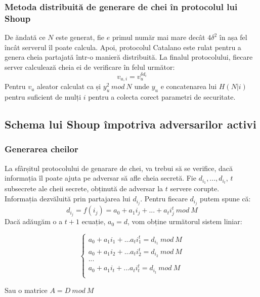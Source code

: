 \documentclass[12]{report}
\begin{document}
\subsubsection{Metoda distribuită de generare de chei în protocolul lui Shoup}
De ăndată ce $N$ este generat, fie $e$ primul număr mai mare decât $4 \delta^{2}$  în așa fel încât serverul îl poate calcula. Apoi, protocolul Catalano \cite{catalano} este rulat pentru a genera cheia partajată într-o manieră distribuită. La finalul protocolului, fiecare server calculează cheia ei de verificare în felul următor:
$$ v_{u,i} = v_{u}^{\delta d_i}$$
Pentru $v_u$ aleator calculat ca și $y_{u}^{2} \ mod \ N$ unde $y_u$ e concatenarea lui $H(N|i)$ pentru suficient de mulți $i$ pentru a colecta corect parametri de securitate.

\subsection{Schema lui Shoup împotriva adversarilor activi}
\subsubsection{Generarea cheilor}
La sfârșitul protocolului de genarare de chei, va trebui să se verifice, dacă informația îl poate ajuta pe adversar să afle cheia secretă. Fie $d_{i_1},...,d_{i_t}$, $t$ subsecrete ale cheii secrete, obținută de adversar la $t$ servere corupte. \\
Informația dezvăluită prin partajarea lui $d_{i_j}$. Pentru fiecare $d_{i_j}$ putem spune că: 
$$d_{i_j} = f(i_j) = a_0 + a_1i_j + ... + a_t i_{j}^{t} \ mod \ M       $$
Dacă adăugăm o a $t+1$ ecuație, $a_0=d$, vom obține următorul sistem liniar:



\[
\left\{ 
\begin{array}{c}
a_0 + a_1 i_1 + ... a_t i_{1}^{t}  = d_{i_1} \ mod \ M \\ 
a_0 + a_1 i_2 + ... a_t i_{2}^{t}  = d_{i_2} \ mod \ M \\ 
... \\
a_0 + a_1 i_t + ... a_t i_{t}^{t}  = d_{i_t} \ mod \ M \\
\end{array}
\right. 
\]

Sau o matrice $A = D \ mod \ M$
\end{document}
